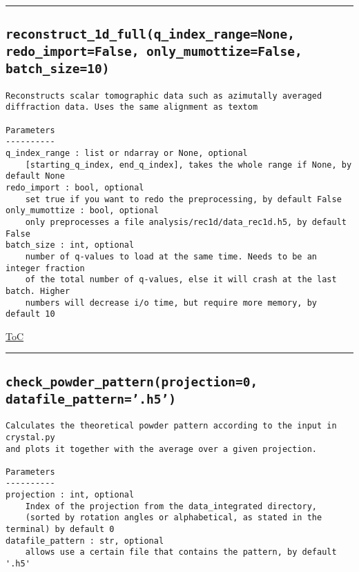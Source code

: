 \documentclass{article}
\begin{document}
\vspace{5mm}

\hrule

\subsection*{\texttt{reconstruct\_1d\_full(q\_index\_range=None, redo\_import=False, only\_mumottize=False, batch\_size=10)}}
\label{fun:reconstruct1dfull}

\begin{lstlisting}[language=docstring]
Reconstructs scalar tomographic data such as azimutally averaged
diffraction data. Uses the same alignment as textom

Parameters
----------    
q_index_range : list or ndarray or None, optional
    [starting_q_index, end_q_index], takes the whole range if None, by default None
redo_import : bool, optional
    set true if you want to redo the preprocessing, by default False
only_mumottize : bool, optional
    only preprocesses a file analysis/rec1d/data_rec1d.h5, by default False
batch_size : int, optional
    number of q-values to load at the same time. Needs to be an integer fraction
    of the total number of q-values, else it will crash at the last batch. Higher
    numbers will decrease i/o time, but require more memory, by default 10
\end{lstlisting}

\begin{flushright}

\hyperref[toc]{ToC}

\end{flushright}



\vspace{5mm}

\hrule

\subsection*{\texttt{check\_powder\_pattern(projection=0, datafile\_pattern='.h5')}}
\label{fun:checkpowderpattern}

\begin{lstlisting}[language=docstring]
Calculates the theoretical powder pattern according to the input in crystal.py
and plots it together with the average over a given projection.

Parameters
----------
projection : int, optional
    Index of the projection from the data_integrated directory,
    (sorted by rotation angles or alphabetical, as stated in the terminal) by default 0
datafile_pattern : str, optional
    allows use a certain file that contains the pattern, by default '.h5'
\end{lstlisting}
\end{document}
